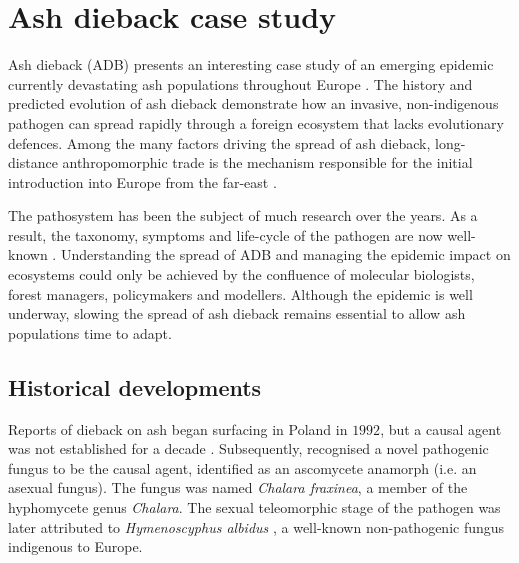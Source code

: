 
\section{Ash dieback case study}


\label{ch2:ash-dieback}
Ash dieback (ADB) presents an interesting case study of an emerging epidemic currently devastating ash
populations throughout Europe \cite{enderle2019overview}. The history and predicted evolution of ash dieback
demonstrate how an invasive, non-indigenous pathogen can spread rapidly through a foreign ecosystem that 
lacks evolutionary defences. Among the many factors driving the spread of ash dieback, long-distance 
anthropomorphic trade is the mechanism responsible for the initial introduction into Europe from the
far-east \cite{zhao2013hymenoscyphus, queloz2011cryptic}.

The pathosystem has been the subject of much research over the years. As a result, the taxonomy, 
symptoms and life-cycle of the pathogen are  now well-known \cite{https://doi.org/10.1111/mpp.12073}. 
Understanding the spread of ADB and managing the epidemic impact on ecosystems could only be achieved
by the confluence of molecular biologists, forest managers, policymakers and modellers. Although the epidemic
is well underway, slowing the spread of ash dieback remains essential to allow ash populations time to adapt.

\subsection{Historical developments}

Reports of dieback on ash began surfacing in Poland in $1992$, but a causal agent was not established
for a decade \cite{kowalski2001zamieraniu, coetsee2000xenochalara}. Subsequently, \cite{kowalski2006chalara} 
recognised a novel pathogenic fungus to be the causal agent, identified as an ascomycete anamorph (i.e. an asexual fungus).
The fungus was named \textit{Chalara fraxinea}, a member of the hyphomycete genus \textit{Chalara}. 
The sexual teleomorphic stage of the pathogen was later attributed to \textit{Hymenoscyphus albidus} 
\cite{kowalski2009teleomorph}, a well-known non-pathogenic fungus indigenous to Europe.

